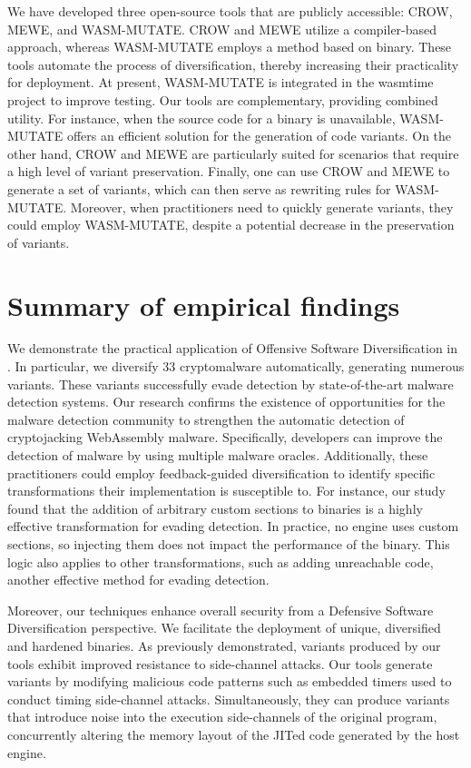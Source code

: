 We have developed three open-source tools that are publicly accessible: CROW, MEWE, and WASM-MUTATE. 
CROW and MEWE utilize a compiler-based approach, whereas WASM-MUTATE employs a method based on binary. 
These tools automate the process of diversification, thereby increasing their practicality for deployment. 
At present, WASM-MUTATE is integrated in the wasmtime project to improve testing. 
Our tools are complementary, providing combined utility. 
For instance, when the source code for a \Wasm binary is unavailable, WASM-MUTATE offers an efficient solution for the generation of code variants. 
On the other hand, CROW and MEWE are particularly suited for scenarios that require a high level of variant preservation.
Finally, one can use CROW and MEWE to generate a set of variants, which can then serve as rewriting rules for WASM-MUTATE. 
Moreover, when practitioners need to quickly generate variants, they could employ WASM-MUTATE, despite a potential decrease in the preservation of variants.


 

\section{Summary of empirical findings}

We demonstrate the practical application of Offensive Software Diversification in \Wasm.
In particular, we diversify 33 \Wasm cryptomalware automatically, generating numerous variants.
These variants successfully evade detection by state-of-the-art malware detection systems.
Our research confirms the existence of opportunities for the malware detection community to strengthen the automatic detection of cryptojacking WebAssembly malware.
Specifically, developers can improve the detection of \Wasm malware by using multiple malware oracles.
Additionally, these practitioners could employ feedback-guided diversification to identify specific transformations their implementation is susceptible to.
For instance, our study found that the addition of arbitrary custom sections to \Wasm binaries is a highly effective transformation for evading detection.
In practice, no \Wasm engine uses custom sections, so injecting them does not impact the performance of the \Wasm binary. 
This logic also applies to other transformations, such as adding unreachable code, another effective method for evading detection.

Moreover, our techniques enhance overall security from a Defensive Software Diversification perspective.
We facilitate the deployment of unique, diversified and hardened \Wasm binaries.
As previously demonstrated, \Wasm variants produced by our tools exhibit improved resistance to side-channel attacks.
Our tools generate variants by modifying malicious code patterns such as embedded timers used to conduct timing side-channel attacks.
Simultaneously, they can produce variants that introduce noise into the execution side-channels of the original program, concurrently altering the memory layout of the JITed code generated by the host engine.


